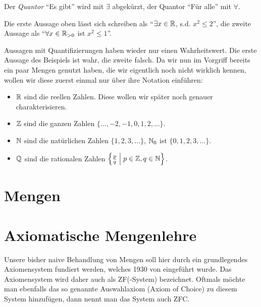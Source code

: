 {Der \emph{Quantor} \enquote{Es gibt} wird mit $\exists$ abgekürzt, der Quantor \enquote{Für alle} mit $\forall$.

\begin{example}[fortgesetzt]
  Die erste Aussage oben lässt sich schreiben als \enquote{$\exists x \in \mathbb{R}$, s.d. $x^2 \leq 2$}, die zweite Aussage als \enquote{$\forall x \in \mathbb{R}_{>0}$ ist $x^2 \leq 1$}.
\end{example}

Aussagen mit Quantifizierungen haben wieder nur einen Wahrheitswert. Die erste Aussage des Beispiels ist wahr, die zweite falsch. Da wir nun im Vorgriff bereits ein paar Mengen genutzt haben, die wir eigentlich noch nicht wirklich kennen, wollen wir diese zuerst einmal nur über ihre Notation einführen:

\begin{notation}
  \mbox{}
  \begin{itemize}
    \item $\mathbb{R}$ sind die reellen Zahlen. Diese wollen wir später noch genauer charakterisieren.
    \item $\mathbb{Z}$ sind die ganzen Zahlen $\{\ldots,-2,-1,0,1,2,\ldots\}$.
    \item $\mathbb{N}$ sind die natürlichen Zahlen $\{1,2,3,\ldots\}$, $\mathbb{N}_0$ ist $\{0,1,2,3,\ldots\}$.
    \item $\mathbb{Q}$ sind die rationalen Zahlen \(\setdef{\frac{p}{q}}[p \in \ZZ, q \in \NN]\).
  \end{itemize}
\end{notation}


\section{Mengen}


\section{Axiomatische Mengenlehre}

Unsere bisher naive Behandlung von Mengen soll hier durch ein grundlegendes Axiomensystem fundiert werden, welches 1930 von \textcite{Zerme:UeberGrenzzahlenund} eingeführt wurde. Das Axiomensystem wird daher auch als ZF(-System) bezeichnet. Oftmals möchte man ebenfalls das so genannte Auswahlaxiom (Axiom of Choice) zu diesem System hinzufügen, dann nennt man das System auch ZFC.}
